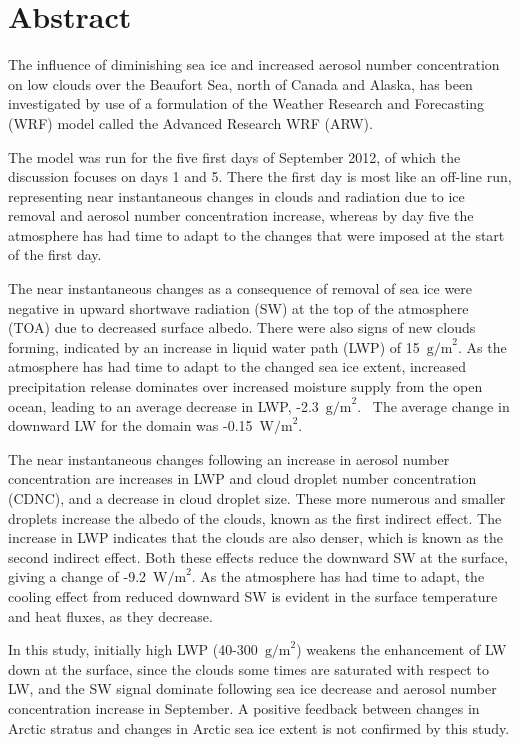 \chapter*{Abstract}
The influence of diminishing sea ice and increased aerosol number concentration on low clouds over the Beaufort Sea, north of Canada and Alaska, has been investigated by use of a formulation of the Weather Research and Forecasting (WRF) model called the Advanced Research WRF (ARW).

The model was run for the five first days of September 2012, of which the discussion focuses on days 1 and 5. There the first day is most like an off-line run, representing near instantaneous changes in clouds and radiation due to ice removal and aerosol number concentration increase, whereas by day five the atmosphere has had time to adapt to the changes that were imposed at the start of the first day.

The near instantaneous changes as a consequence of removal of sea ice were negative in upward shortwave radiation (SW) at the top of the atmosphere (TOA) due to decreased surface albedo. There were also signs of new clouds forming, indicated by an increase in liquid water path (LWP) of 15~$\text{g/m}^2$. As the atmosphere has had time to adapt to the changed sea ice extent, increased precipitation release dominates over increased moisture supply from the open ocean, leading to an average decrease in LWP, -2.3~$\text{g/m}^2$. %
~The average change in downward LW for the domain was -0.15~$\text{W/m}^2$.

The near instantaneous changes following an increase in aerosol number concentration are increases in LWP and cloud droplet number concentration (CDNC), and a decrease in cloud droplet size. These more numerous and smaller droplets increase the albedo of the clouds, known as the first indirect effect. The increase in LWP indicates that the clouds are also denser, which is known as the second indirect effect. Both these effects reduce the downward SW at the surface, giving a change of -9.2~$\text{W/m}^2$. As the atmosphere has had time to adapt, the cooling effect from reduced downward SW is evident in the surface temperature and heat fluxes, as they decrease.

In this study, initially high LWP (40-300~$\text{g/m}^2$) weakens the enhancement of LW down at the surface, since the clouds some times are saturated with respect to LW, and the SW signal dominate following sea ice decrease and aerosol number concentration increase in September. A positive feedback between changes in Arctic stratus and changes in Arctic sea ice extent is not confirmed by this study.